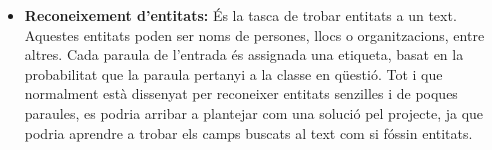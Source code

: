\begin{itemize}
    \item \textbf{Reconeixement d'entitats:} És la tasca de trobar entitats a un text. Aquestes entitats poden ser noms de persones, llocs o organitzacions, entre altres. Cada paraula de l'entrada és assignada una etiqueta, basat en la probabilitat que la paraula pertanyi a la classe en qüestió. Tot i que normalment està dissenyat per reconeixer entitats senzilles i de poques paraules, es podria arribar a plantejar com una solució pel projecte, ja que podria aprendre a trobar els camps buscats al text com si fóssin entitats.
\end{itemize}
